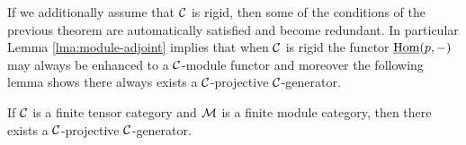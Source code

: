 \documentclass{amsart}
\begin{document}

If we additionally assume that $\mathcal C$ is rigid, then some of the conditions of the previous theorem are automatically satisfied and become redundant. In particular Lemma \ref{lma:module-adjoint} implies that when $\mathcal C$ is rigid the functor $\operatorname{\underline{Hom}}(p,-)$ may always be enhanced to a $\mathcal C$-module functor and moreover the following lemma shows there always exists a $\mathcal C$-projective $\mathcal C$-generator.  
\begin{lemma}{\cite[\S 2.11]{EGNO}} \label{lma:Enough_C-projs}
	If $\mathcal C$ is a finite tensor category and $\mathcal M$ is a finite module category, then there exists a $\mathcal C$-projective $\mathcal C$-generator. 
\end{lemma} 
\end{document}
